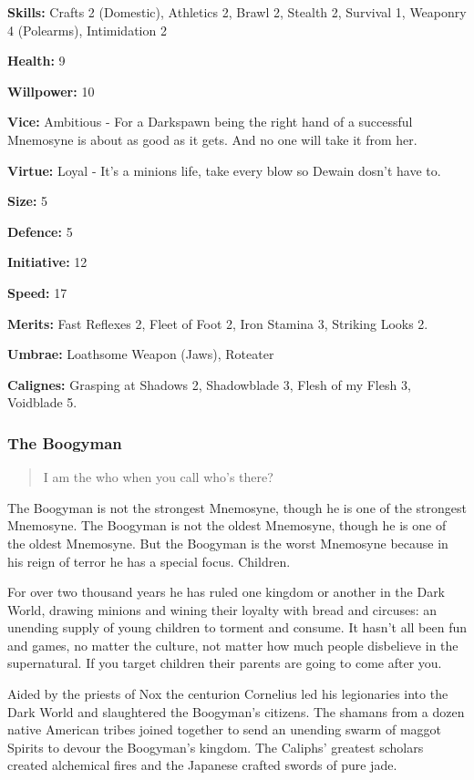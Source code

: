 \noindent \textbf{Skills:} Crafts 2 (Domestic), Athletics 2, Brawl 2, Stealth 2, Survival 1, Weaponry 4 (Polearms), Intimidation 2

\noindent \textbf{Health:} 9

\noindent \textbf{Willpower:} 10

\noindent \textbf{Vice:} Ambitious - For a Darkspawn being the right hand of a successful Mnemosyne is about as good as it gets. And no one will take it from her.

\noindent \textbf{Virtue:} Loyal - It's a minions life, take every blow so Dewain dosn't have to.

\noindent \textbf{Size:} 5

\noindent \textbf{Defence:} 5

\noindent \textbf{Initiative:} 12

\noindent \textbf{Speed:} 17

\noindent \textbf{Merits:} Fast Reflexes 2, Fleet of Foot 2, Iron Stamina 3, Striking Looks 2.

\noindent \textbf{Umbrae:} Loathsome Weapon (Jaws), Roteater

\noindent \textbf{Calignes:} Grasping at Shadows 2, Shadowblade 3,  Flesh of my Flesh 3, Voidblade 5.

\subsubsection*{The Boogyman}

\begin{quote}I am the who when you call who's there?\end{quote}

The Boogyman is not the strongest Mnemosyne, though he is one of the strongest Mnemosyne. The Boogyman is not the oldest Mnemosyne, though he is one of the oldest Mnemosyne. But the Boogyman is the worst Mnemosyne because in his reign of terror he has a special focus. Children.

For over two thousand years he has ruled one kingdom or another in the Dark World, drawing minions and wining their loyalty with bread and circuses: an unending supply of young children to torment and consume. It hasn't all been fun and games, no matter the culture, not matter how much people disbelieve in the supernatural. If you target children their parents are going to come after you.

Aided by the priests of Nox the centurion Cornelius led his legionaries into the Dark World and slaughtered the Boogyman's citizens. The shamans from a dozen native American tribes joined together to send an unending swarm of maggot Spirits to devour the Boogyman's kingdom. The Caliphs' greatest scholars created alchemical fires and the Japanese crafted swords of pure jade.

